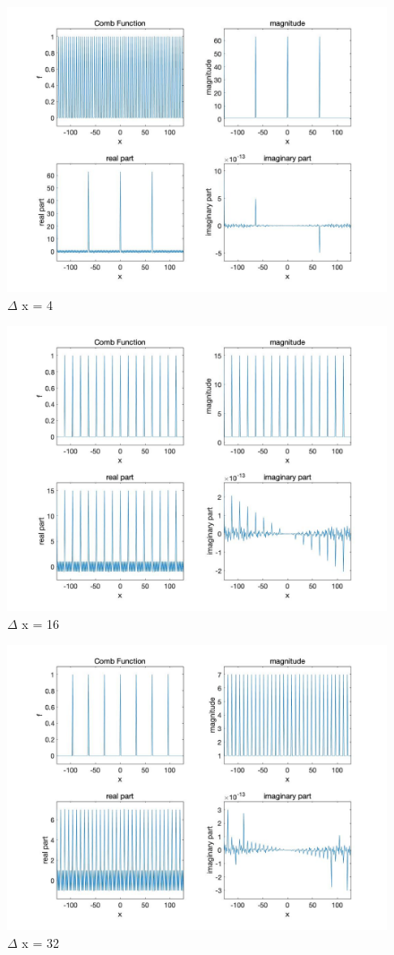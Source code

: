 \documentclass[11pt,a4paper,BCOR12mm, headexclude, footexclude, twoside, openright]{scrartcl}
\numberwithin{equation}{section} %
\numberwithin{figure}{section} %
\numberwithin{table}{section} %
\begin{document}
\newpage

\begin{figure}[h!]
\centering
\includegraphics[scale=0.35]{d4.jpg}
\caption{$\Delta$ x = 4}
\end{figure}


\newpage


\begin{figure}[h!]
\centering
\includegraphics[scale=0.35]{d16.jpg}
\caption{$\Delta$ x = 16}
\end{figure}

\newpage

\begin{figure}[h!]
\centering
\includegraphics[scale=0.35]{d32.jpg}
\caption{$\Delta$ x = 32}
\end{figure}
\end{document}
